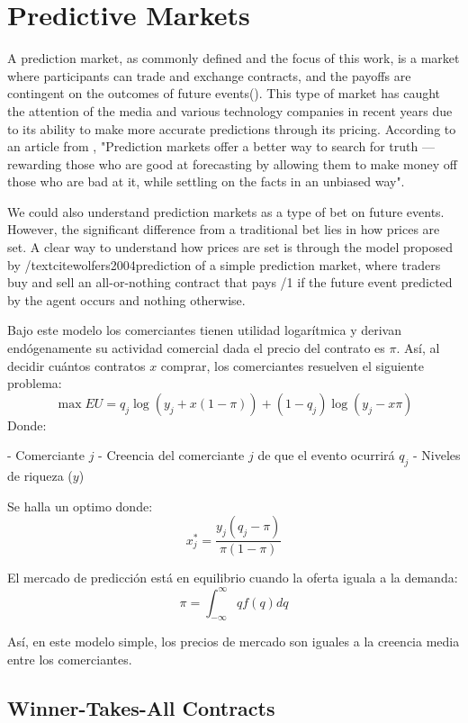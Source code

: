 \section{Predictive Markets}
\label{sec:predictive_markets}

A prediction market, as commonly defined and the focus of this work, is a market where participants can trade and exchange contracts, and the payoffs are contingent on the outcomes of future events(\citeauthor{wolfers2004prediction}). This type of market has caught the attention of the media and various technology companies in recent years due to its ability to make more accurate predictions through its pricing. According to an article from \textcite{Roose_2023}, "Prediction markets offer a better way to search for truth — rewarding those who are good at forecasting by allowing them to make money off those who are bad at it, while settling on the facts in an unbiased way".

We could also understand prediction markets as a type of bet on future events. However, the significant difference from a traditional bet lies in how prices are set. A clear way to understand how prices are set is through the model proposed by  /textcite{wolfers2004prediction}  of a simple prediction market, where traders buy and sell an all-or-nothing contract that pays  /1 if the future event predicted by the agent occurs and nothing otherwise.

Bajo este modelo los comerciantes tienen utilidad logarítmica y derivan endógenamente su actividad comercial dada el precio del contrato es \( \pi \). Así, al decidir cuántos contratos \( x \) comprar, los comerciantes resuelven el siguiente problema:
\begin{equation}
    \max EU = q_j \log(y_j + x(1 - \pi)) + (1 - q_j) \log(y_j - x\pi)
\end{equation}
Donde:

- Comerciante \( j \)
- Creencia del comerciante \( j \) de que el evento ocurrirá \( q_j \)
- Niveles de riqueza (\( y \))

Se halla un optimo donde:
\begin{equation}
    x_j^* = \frac{y_j(q_j - \pi)}{\pi(1 - \pi)}
\end{equation}


El mercado de predicción está en equilibrio cuando la oferta iguala a la demanda:
\begin{equation}
    \pi = \int_{-\infty}^{\infty} q f(q) dq
\end{equation}

Así, en este modelo simple, los precios de mercado son iguales a la creencia media entre los comerciantes.


\lipsum[2]

\subsection{Winner-Takes-All Contracts}
\label{subsec:winner_takes_all_contracts}

\lipsum[2]
